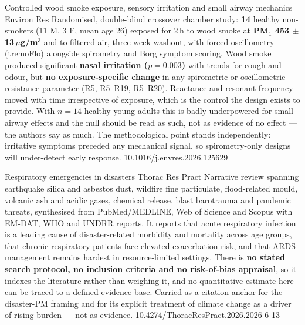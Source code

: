 \documentclass[10pt]{article}
\begin{document}
{Controlled wood smoke exposure, sensory irritation and small airway mechanics}
{Environ Res}
{Randomised, double-blind crossover chamber study: \textbf{14} healthy non-smokers (11 M, 3 F,
mean age 26) exposed for 2\,h to wood smoke at \textbf{PM$_1$ 453 $\pm$ 13\,$\mu$g/m$^3$} and
to filtered air, three-week washout, with forced oscillometry (tremoFlo) alongside spirometry
and Borg symptom scoring. Wood smoke produced significant \textbf{nasal irritation
($p=0.003$)} with trends for cough and odour, but \textbf{no exposure-specific change} in any
spirometric or oscillometric resistance parameter (R5, R5--R19, R5--R20). Reactance and
resonant frequency moved with time irrespective of exposure, which is the control the design
exists to provide. With $n=14$ healthy young adults this is badly underpowered for small-airway
effects and the null should be read as such, not as evidence of no effect --- the authors say
as much. The methodological point stands independently: irritative symptoms preceded any
mechanical signal, so spirometry-only designs will under-detect early response.}
{10.1016/j.envres.2026.125629}

{Respiratory emergencies in disasters}
{Thorac Res Pract}
{Narrative review spanning earthquake silica and asbestos dust, wildfire fine particulate,
flood-related mould, volcanic ash and acidic gases, chemical release, blast barotrauma and
pandemic threats, synthesised from PubMed/MEDLINE, Web of Science and Scopus with EM-DAT, WHO
and UNDRR reports. It reports that acute respiratory infection is a leading cause of
disaster-related morbidity and mortality across age groups, that chronic respiratory patients
face elevated exacerbation risk, and that ARDS management remains hardest in
resource-limited settings. There is \textbf{no stated search protocol, no inclusion criteria
and no risk-of-bias appraisal}, so it indexes the literature rather than weighing it, and no
quantitative estimate here can be traced to a defined evidence base. Carried as a citation
anchor for the disaster-PM framing and for its explicit treatment of climate change as a
driver of rising burden --- not as evidence.}
{10.4274/ThoracResPract.2026.2026-6-13}

\end{document}
